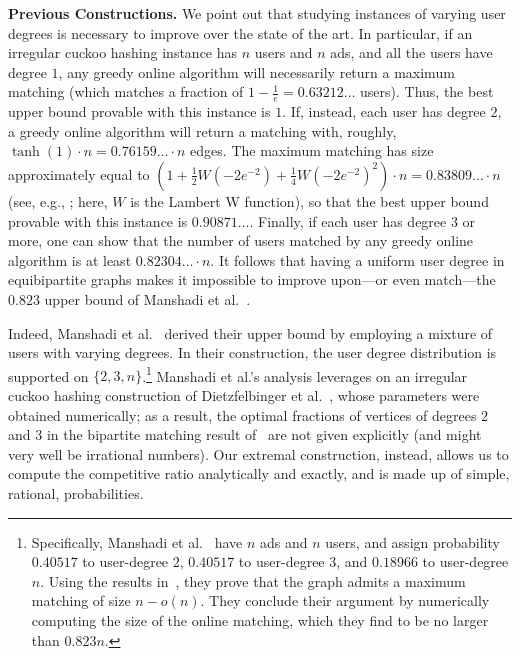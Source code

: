 \documentclass[11pt]{article}
\begin{document}
\smallskip

{\bf Previous Constructions.} We point out that studying  instances of varying user degrees is necessary to improve over the state of the art. In particular, if an irregular cuckoo hashing instance has $n$ users and $n$ ads, and all the users have degree $1$, any greedy online algorithm will necessarily return a maximum matching (which matches a fraction of $1 - \frac1e = 0.63212\ldots$ users). Thus, the best upper bound provable with this instance is $1$. If, instead, each user has degree $2$, a greedy online algorithm will return a matching with, roughly, $\tanh(1) \cdot n = 0.76159\ldots \cdot n$ edges.         The maximum matching  has size approximately equal to $\left(1 + \frac12 W\left(-2 e^{-2}\right)+\frac14 W\left(-2 e^{-2}\right)^2\right) \cdot n = 0.83809\ldots \cdot n$ (see, e.g., \cite{khk11}; here, $W$ is the Lambert W function), so that the best upper bound provable with this instance is $0.90871\ldots$. Finally,  if each user has degree $3$ or more, one can show that the number of  users matched by any greedy online algorithm is at least $0.82304\ldots \cdot n$. 
It follows that having a uniform user degree in  equibipartite graphs makes it impossible to improve upon---or even match---the  $0.823$ upper bound of Manshadi et al.~\cite{mos11}.

\smallskip

Indeed, Manshadi et al.~\cite{mos11} derived their upper bound by employing a mixture of users with varying degrees. In their construction, the user degree distribution is supported on $\{2,3,n\}$.\footnote{Specifically, Manshadi et al.~\cite{mos11} have $n$ ads and $n$ users, and assign probability $0.40517$ to user-degree $2$, $0.40517$ to user-degree $3$, and $0.18966$ to user-degree $n$. Using the results in~\cite{dgmmpr10}, they prove that the graph admits a maximum matching of size $n - o(n)$. They conclude their argument by numerically computing the size of the online matching, which they find to be no larger than $0.823n$.} Manshadi et al.'s analysis leverages on an irregular cuckoo hashing construction of Dietzfelbinger et al.~\cite{dgmmpr10}, whose parameters were obtained numerically; as a result, the optimal fractions of vertices of degrees $2$ and $3$ in the bipartite matching result of~\cite{mos11} are not given explicitly (and might very well be irrational numbers). Our extremal construction, instead, allows us to compute the competitive ratio analytically and exactly, and is made up of simple, rational, probabilities.
\end{document}
